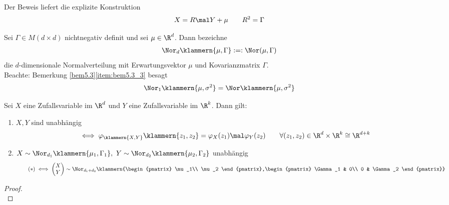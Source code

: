 \begin{bemerkung}
	Der Beweis liefert die explizite Konstruktion
	\begin{align*}
		X=R\mal Y+\mu 
		\qquad
		R^2=\Gamma
	\end{align*}
\end{bemerkung}

\begin{notation}
	Sei $\Gamma\in M(d\times d)$ nichtnegativ definit und sei $\mu\in\R^d$.
	Dann bezeichne
	\begin{align*}
		\Nor_d\klammern{\mu,\Gamma}:=:\Nor(\mu,\Gamma)
	\end{align*}
	die $d$-dimensionale Normalverteilung mit Erwartungsvektor $\mu$ und Kovarianzmatrix $\Gamma$.\\
	Beachte: Bemerkung \ref{bem5.3}\ref{item:bem5.3_3} besagt
	\begin{align*}
		\Nor_1\klammern{\mu,\sigma^2}=\Nor\klammern{\mu,\sigma^2}
	\end{align*}
\end{notation}

\setcounter{satz}{6} %
\begin{satz}\label{satz5.7Einhalb}
	Sei $X$ eine Zufallsvariable im $\R^d$ und $Y$ eine Zufallsvariable im $\R^k$. Dann gilt:
	\begin{enumerate}[label=(\arabic*)]
		\item $X,Y$ sind unabhängig
		\label{item:satz5.7Einhalb_1}
		\begin{align*}
			\iff \varphi_{\klammern{X,Y}}\klammern{z_1,z_2}
			=\varphi_X(z_1)\mal\varphi_Y(z_2)
			\qquad\forall (z_1,z_2)\in\R^d\times\R^k\cong \R^{d+k}
		\end{align*}
		\item $\begin{aligned}
			X\sim\Nor_{d_1}\klammern{\mu_1,\Gamma_1},~Y\sim\Nor_{d_2}\klammern{\mu_2,\Gamma_2}
		\end{aligned}$ unabhängig
		\begin{align}\label{eq:Satz5.7Einhalb_2Stern}\tag{$*$}
			\iff
			\begin{pmatrix}
				X\\
				Y
			\end{pmatrix}
			\sim\Nor_{d_1+d_2}\klammern{\begin{pmatrix}
				\mu_1\\
				\mu_2
			\end{pmatrix},\begin{pmatrix}
				\Gamma_1 & 0\\
				0 & \Gamma_2
			\end{pmatrix}}
		\end{align}
		\label{item:satz5.7Einhalb_2}
	\end{enumerate}
\end{satz}

\begin{proof}
	\\
\end{proof}

